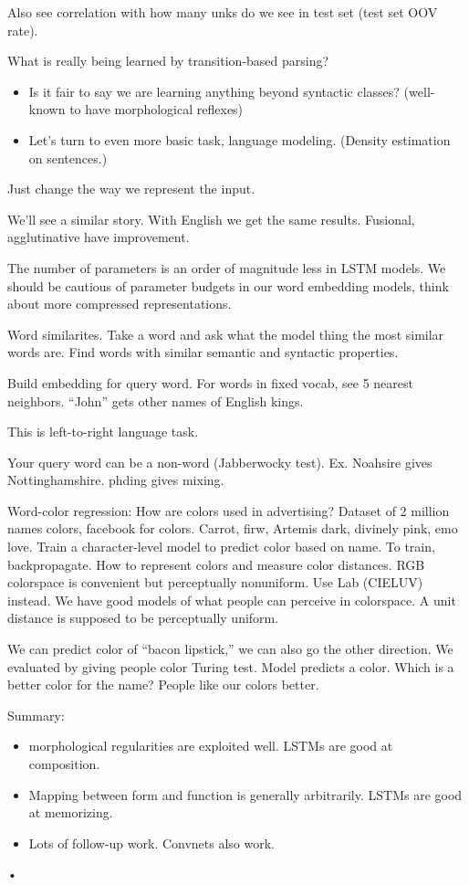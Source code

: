 Also see correlation with how many unks do we see in test set (test set OOV rate).

What is really being learned by transition-based parsing?
\begin{itemize}
\item
Is it fair to say we are learning anything beyond syntactic classes? (well-known to have morphological reflexes)
\item
Let's turn to even more basic task, language modeling.  (Density estimation on sentences.)
\end{itemize}

Just change the way we represent the input. 

We'll see a similar story. With English we get the same results. Fusional, agglutinative have improvement.

The number of parameters is an order of magnitude less in LSTM models. We should be cautious of parameter budgets in our word embedding models, think about more compressed representations.

Word similarites. Take a word and ask what the model thing the most similar words are. Find words with similar semantic and syntactic properties.

Build embedding for query word. For words in fixed vocab, see 5 nearest neighbors. ``John'' gets other names of English kings.

This is left-to-right language task. 

Your query word can be a non-word (Jabberwocky test). Ex. Noahsire gives Nottinghamshire. phding gives mixing.

Word-color regression: How are colors used in advertising? Dataset of 2 million names colors, facebook for colors. Carrot, firw, Artemis dark, divinely pink, emo love. Train a character-level model to predict color based on name. To train, backpropagate. How to represent colors and measure color distances. RGB colorspace is convenient but perceptually nonuniform. Use Lab (CIELUV) instead. We have good models of what people can perceive in colorspace. A unit distance is supposed to be perceptually uniform. 

We can predict color of ``bacon lipstick,'' we can also go the other direction. We evaluated by giving people color Turing test. Model predicts a color. 
Which is a better color for the name? People like our colors better.

Summary: 
\begin{itemize}
\item
morphological regularities are exploited well. LSTMs are good at composition. 
\item
Mapping between form and function is generally arbitrarily. LSTMs are good at memorizing. 
\item
Lots of follow-up work. Convnets also work.
\end{itemize}•

